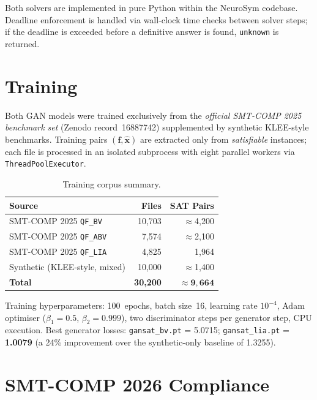 \documentclass[10pt,a4paper]{article}
\begin{document}
Both solvers are implemented in pure Python within the NeuroSym codebase.
Deadline enforcement is handled via wall-clock time checks between solver
steps; if the deadline is exceeded before a definitive answer is found,
\texttt{unknown} is returned.

\section{Training}

Both GAN models were trained exclusively from the \emph{official SMT-COMP
2025 benchmark set} (Zenodo record~16887742) supplemented by synthetic
KLEE-style benchmarks.  Training pairs $({\mathbf{f}}, \hat{\mathbf{x}})$
are extracted only from \emph{satisfiable} instances; each file is processed
in an isolated subprocess with eight parallel workers via
\texttt{ThreadPoolExecutor}.

\begin{table}[h]
\centering
\caption{Training corpus summary.}
\label{tab:training}
\begin{tabular}{@{}lrr@{}}
\toprule
\textbf{Source} & \textbf{Files} & \textbf{SAT Pairs} \\
\midrule
SMT-COMP 2025 \texttt{QF\_BV}  & 10,703 & $\approx$4,200 \\
SMT-COMP 2025 \texttt{QF\_ABV} &  7,574 & $\approx$2,100 \\
SMT-COMP 2025 \texttt{QF\_LIA} &  4,825 &         1,964  \\
Synthetic (KLEE-style, mixed)  & 10,000 & $\approx$1,400 \\
\midrule
\textbf{Total} & \textbf{30,200} & $\mathbf{\approx 9,664}$ \\
\bottomrule
\end{tabular}
\end{table}

\noindent Training hyperparameters: 100~epochs, batch size~16, learning rate
$10^{-4}$, Adam optimiser ($\beta_1=0.5$, $\beta_2=0.999$), two discriminator
steps per generator step, CPU execution.  Best generator losses:
\texttt{gansat\_bv.pt} = 5.0715; \texttt{gansat\_lia.pt} = \textbf{1.0079}
(a 24\% improvement over the synthetic-only baseline of 1.3255).

\section{SMT-COMP 2026 Compliance}
\end{document}
